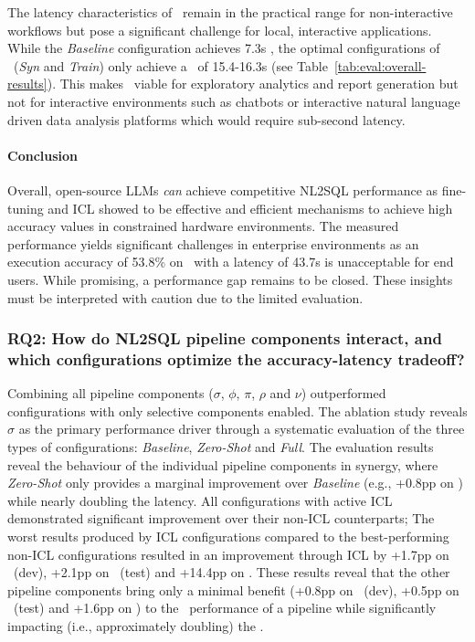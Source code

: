 The latency characteristics of \Natural~remain in the practical range for
non-interactive workflows but pose a significant challenge for local,
interactive applications. While the \textit{Baseline} configuration achieves
7.3s \CL, the optimal configurations of \Natural~(\textit{Syn} and \textit{Train})
only achieve a \CL~of 15.4-16.3s (see Table~\ref{tab:eval:overall-results}).
This makes \Natural~viable for exploratory analytics and report generation but
not for interactive environments such as chatbots or interactive natural
language driven data analysis platforms which would require sub-second latency.

\paragraph{Conclusion}

Overall, open-source LLMs \textit{can} achieve competitive NL2SQL performance
as fine-tuning and ICL showed to be effective and efficient mechanisms to
achieve high accuracy values in constrained hardware environments. The measured
performance yields significant challenges in enterprise environments as an
execution accuracy of 53.8\% on \Bird~with a latency of 43.7s is unacceptable
for end users. While promising, a performance gap remains to be closed. These
insights must be interpreted with caution due to the limited evaluation. 

\subsubsection{RQ2: How do NL2SQL pipeline components interact,
and which configurations optimize the accuracy-latency tradeoff?}

Combining all pipeline components ($\sigma$, $\phi$, $\pi$, $\rho$ and $\nu$)
outperformed configurations with only selective components enabled. The
ablation study reveals $\sigma$ as the primary performance driver through a
systematic evaluation of the three types of configurations: \textit{Baseline},
\textit{Zero-Shot} and \textit{Full}. The evaluation results reveal the
behaviour of the individual pipeline components in synergy, where
\textit{Zero-Shot} only provides a marginal improvement over \textit{Baseline}
(e.g., +0.8pp on \Spider) while nearly doubling the latency. All configurations
with active ICL demonstrated significant improvement over their non-ICL
counterparts; The worst results produced by ICL configurations compared to the
best-performing non-ICL configurations resulted in an improvement through ICL
by +1.7pp on \Spider~(dev), +2.1pp on \Spider~(test) and +14.4pp on \Bird.
These results reveal that the other pipeline components bring only a minimal
benefit (+0.8pp on \Spider~(dev), +0.5pp on \Spider~(test) and +1.6pp on \Bird)
to the \EA~performance of a pipeline while significantly impacting (i.e.,
approximately doubling) the \CL.

